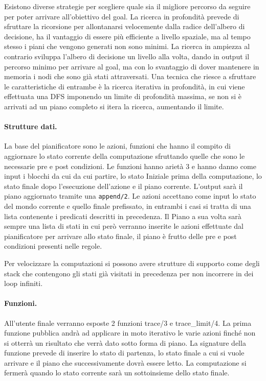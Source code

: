\documentclass[12pt,twoside]{report}
\begin{document}
Esistono diverse strategie per scegliere quale sia il migliore percorso da seguire per poter arrivare all'obiettivo del goal. La ricerca in profondità prevede di sfruttare la ricorsione per allontanarsi velocemente dalla radice dell'albero di decisione, ha il vantaggio di essere più efficiente a livello spaziale, ma al tempo stesso i piani che vengono generati non sono minimi.
La ricerca in ampiezza al contrario sviluppa l'albero di decisione un livello alla volta, dando in output il percorso minimo per arrivare al goal, ma con lo svantaggio di dover mantenere in memoria i nodi che sono già stati attraversati.
Una tecnica che riesce a sfruttare le caratteristiche di entrambe è la ricerca iterativa in profondità, in cui viene effettuata una DFS imponendo un limite di profondità massima, se non si è arrivati ad un piano completo si itera la ricerca, aumentando il limite.

\paragraph{Strutture dati.} La base del pianificatore sono le azioni, funzioni che hanno il compito di aggiornare lo stato corrente della computazione sfruttando quelle che sono le necessarie pre e post condizioni. Le funzioni hanno arietà 3 e hanno danno come input i blocchi da cui da cui partire, lo stato Iniziale prima della computazione, lo stato finale dopo l'esecuzione dell'azione e il piano corrente. L'output sarà il piano aggiornato tramite una \texttt{append/2}.
Le azioni accettano come input lo stato del mondo corrente e quello finale prefissato, in entrambi i casi si tratta di una lista contenente i predicati descritti in precedenza.
Il Piano a sua volta sarà sempre una lista di stati in cui però verranno inserite le azioni effettuate dal pianificatore per arrivare allo stato finale, il piano è frutto delle pre e post condizioni presenti nelle regole.

Per velocizzare la computazioni si possono avere strutture di supporto come degli stack che contengono gli stati già visitati in precedenza per non incorrere in dei loop infiniti.

\paragraph{Funzioni.} All'utente finale verranno esposte 2 funzioni trace/3 e trace\_limit/4. La prima funzione pubblica andrà ad applicare in moto iterativo le varie azioni finché non si otterrà un risultato che verrà dato sotto forma di piano. La signature della funzione prevede di inserire lo stato di partenza, lo stato finale a cui si vuole arrivare e il piano che successivamente dovrà essere letto. La computazione si fermerà quando lo stato corrente sarà un sottoinsieme dello stato finale.
\end{document}
